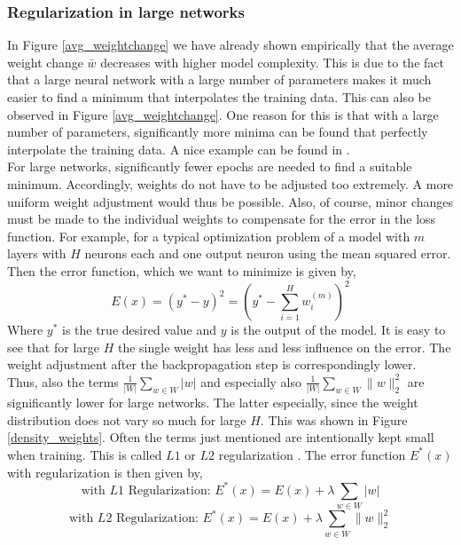\subsubsection{Regularization in large networks}

In Figure \ref{avg_weightchange} we have already shown empirically that the average weight change $\bar{w}$ decreases with higher model complexity. This is due to the fact that a large neural network with a large number of parameters makes it much easier to find a minimum that interpolates the training data. This can also be observed in Figure \ref{avg_weightchange}. One reason for this is that with a large number of parameters, significantly more minima can be found that perfectly interpolate the training data. A nice example can be found in \cite{double_descent_2021_splines}. \\
For large networks, significantly fewer epochs are needed to find a suitable minimum. Accordingly, weights do not have to be adjusted too extremely. A more uniform weight adjustment would thus be possible. Also, of course, minor changes must be made to the individual weights to compensate for the error in the loss function. For example, for a typical optimization problem of a model with $m$ layers with $H$ neurons each and one output neuron using the mean squared error. Then the error function, which we want to minimize is given by,
$$
E(x) = (y^* - y)^2 = (y^* - \sum_{ i= 1}^{H} w_{i}^{(m)})^2
$$
Where $y^*$ is the true desired value and $y$ is the output of the model. It is easy to see that for large $H$ the single weight has less and less influence on the error. The weight adjustment after the backpropagation step is correspondingly lower. \\
Thus, also the terms $\frac{1}{|W|}\sum_{w \in W} |w| $ and especially also $\frac{1}{|W|}\sum_{w \in W} \lVert w \rVert_2^2$ are significantly lower for large networks. The latter especially, since the weight distribution does not vary so much for large $H$. This was shown in Figure \ref{density_weights}. Often the terms just mentioned are intentionally kept small when training. This is called $L1$ or $L2$ regularization \cite{regularization_L1_L2}. 
The error function $E^*(x)$ with regularization is then given by,
    $$
    \text{with $L1$ Regularization:  }  E^*(x) = E(x) + \lambda \sum_{w \in W} |w| 
    $$
    $$
    \text{with $L2$ Regularization:  }  E^*(x) = E(x) + \lambda \sum_{w \in W} \lVert w \rVert_2^2
    $$

